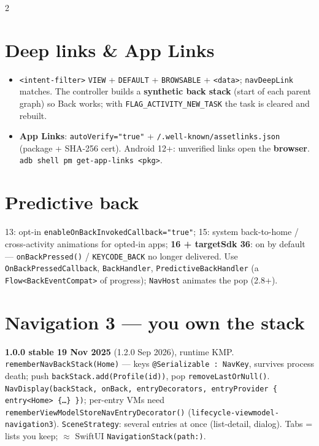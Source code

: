 \documentclass[8pt]{extarticle}
\begin{document}
\begin{multicols}{2}
\section{Deep links \& App Links}
\begin{itemize}\raggedright
  \item \texttt{<intent-filter>} \texttt{VIEW} + \texttt{DEFAULT} + \texttt{BROWSABLE} +
        \texttt{<data>}; \texttt{navDeepLink} matches. The controller builds a
        \textbf{synthetic back stack} (start of each parent graph) so Back works; with
        \texttt{FLAG\_ACTIVITY\_NEW\_TASK} the task is cleared and rebuilt.
  \item \textbf{App Links}: \texttt{autoVerify="true"} + \texttt{/.well-known/assetlinks.json}
        (package + SHA-256 cert). Android 12+: unverified links open the \textbf{browser}.
        \texttt{adb shell pm get-app-links <pkg>}.
\end{itemize}

\section{Predictive back}
\raggedright 13: opt-in \texttt{enableOnBackInvokedCallback="true"}; 15: system
back-to-home / cross-activity animations for opted-in apps; \textbf{16 + targetSdk 36}: on by
default — \texttt{onBackPressed()} / \texttt{KEYCODE\_BACK} no longer delivered. Use
\texttt{OnBackPressedCallback}, \texttt{BackHandler}, \texttt{PredictiveBackHandler} (a
\texttt{Flow<BackEventCompat>} of progress); \texttt{NavHost} animates the pop (2.8+).

\section{Navigation 3 — you own the stack}
\raggedright \textbf{1.0.0 stable 19 Nov 2025} (1.2.0 Sep 2026), runtime KMP.
\texttt{rememberNavBackStack(Home)} — keys \texttt{@Serializable : NavKey}, survives process
death; push \texttt{backStack.add(Profile(id))}, pop \texttt{removeLastOrNull()}.
\texttt{NavDisplay(backStack, onBack, entryDecorators, entryProvider \{ entry<Home> \{…\} \})};
per-entry VMs need \texttt{rememberViewModelStoreNavEntryDecorator()}
(\texttt{lifecycle-viewmodel-navigation3}). \texttt{SceneStrategy}: several entries at once
(list-detail, dialog). Tabs = lists you keep; $\approx$ SwiftUI \texttt{NavigationStack(path:)}.


\end{multicols}

\end{document}
